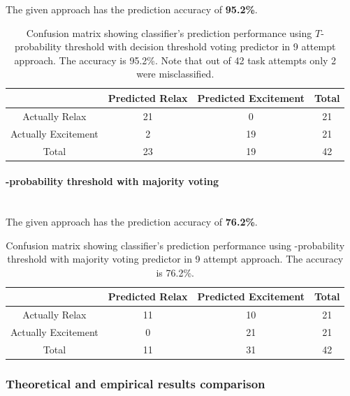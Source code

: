 \documentclass[12pt]{article}
\theoremstyle{definition}
\begin{document}
The given approach has the prediction accuracy of \textbf{95.2\%}.  
\begin{table}[H]
\begin{center}
  \begin{tabular}{ | c | c | c | c | }
    \hline
     & Predicted Relax & Predicted Excitement & Total \\ \hline
    Actually Relax & 21 & 0 & 21 \\ \hline
    Actually Excitement & 2 & 19 & 21 \\ \hline
    Total & 23 & 19 & 42 \\ 
    \hline
  \end{tabular}
\end{center}
\caption{Confusion matrix showing classifier's prediction performance using $T$-probability threshold with decision threshold voting predictor in 9 attempt approach. The accuracy is 95.2\%. Note that out of 42 task attempts only 2 were misclassified.}
\end{table}

\paragraph{-probability threshold with majority voting}~\\

The given approach has the prediction accuracy of \textbf{76.2\%}.  
\begin{table}[H]
\begin{center}
  \begin{tabular}{ | c | c | c | c | }
    \hline
     & Predicted Relax & Predicted Excitement & Total \\ \hline
    Actually Relax & 11 & 10 & 21 \\ \hline
    Actually Excitement & 0 & 21 & 21 \\ \hline
    Total & 11 & 31 & 42 \\ 
    \hline
  \end{tabular}
\end{center}
\caption{Confusion matrix showing classifier's prediction performance using -probability threshold with majority voting predictor in 9 attempt approach. The accuracy is 76.2\%.} 
\end{table}

\subsubsection{Theoretical and empirical results comparison}
\end{document}
